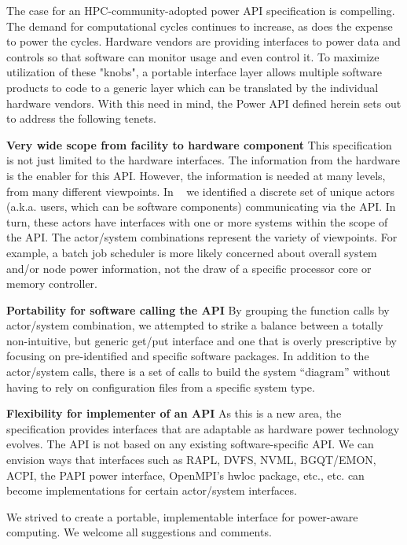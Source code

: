 The case for an HPC-community-adopted power API specification is compelling. 
The demand for computational cycles continues to increase, as does the expense to power the cycles. 
Hardware vendors are providing interfaces to power data and controls so that software can monitor usage and even control it. 
To maximize utilization of these "knobs", a portable interface layer allows multiple software products to code to a generic layer which can be translated by the individual hardware vendors. 
With this need in mind, the Power API defined herein sets out to address the following tenets.

{\bf Very wide scope from facility to hardware component} This specification is not just limited to the hardware interfaces. 
The information from the hardware is the enabler for this API. 
However, the information is needed at many levels, from many different viewpoints. 
In ~\cite{Laros:2013:PwrUseCase} we identified a discrete set of unique actors (a.k.a. users, which can be software components) communicating via the API. 
In turn, these actors have interfaces with one or more systems within the scope of the API. 
The actor/system combinations represent the variety of viewpoints. 
For example, a batch job scheduler is more likely concerned about overall system and/or node power information, not the draw of a specific processor core or memory controller.

{\bf Portability for software calling the API}  By grouping the function calls by actor/system combination, we attempted to strike a balance between a totally non-intuitive, but generic get/put interface and one that is overly prescriptive by focusing on pre-identified and specific software packages. 
In addition to the actor/system calls, there is a set of calls to build the system ``diagram'' without having to rely on configuration files from a specific system type. 

{\bf Flexibility for implementer of an API} As this is a new area, the specification provides interfaces that are adaptable as hardware power technology evolves. 
The API is not based on any existing software-specific API. 
We can envision ways that interfaces such as RAPL, DVFS, NVML, BGQT/EMON, ACPI, the PAPI power interface, OpenMPI's hwloc package, etc., etc. can become implementations for certain actor/system interfaces. 

We strived to create a portable, implementable interface for power-aware computing. 
We welcome all suggestions and comments. 



